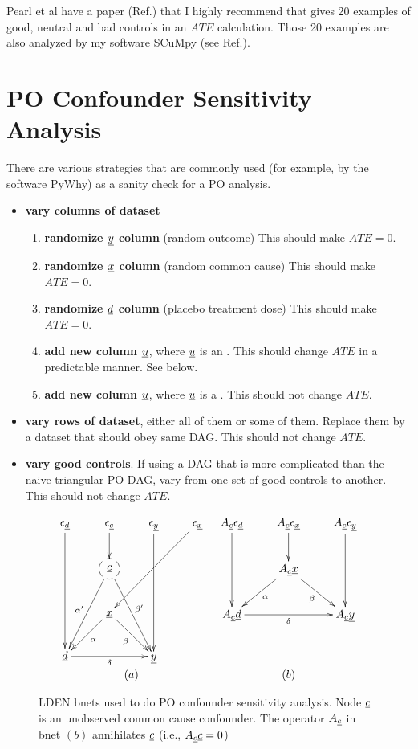 Pearl et al have a paper
(Ref.\cite{pearl-good-neutral-bad})
that I highly recommend
that gives 20 examples
of good, neutral and
bad controls
in an $ATE$ calculation.
Those 20 examples are also analyzed
by my software SCuMpy (see Ref.\cite{scumpy}).

\section{PO Confounder Sensitivity Analysis}
\label{intro-pot-out-sensitivity}

There are various  strategies that are commonly
used (for example, by
the software PyWhy)
as a sanity check for a
PO analysis.
\begin{itemize}
\item {\bf vary columns of dataset}
\begin{enumerate}
\item {\bf randomize $\rvy$ column} (random outcome) This should make $ATE=0$.
\item {\bf randomize $\rvx$ column}
(random common cause) This should make $ATE=0$.
\item {\bf randomize $\rvd$ column} (placebo treatment dose) This should make $ATE=0$.
\item {\bf add new column $\rvu$}, where $\rvu$ is an .
This should change $ATE$ 
in a predictable manner. See below.
\item {\bf add new column $\rvu$}, where $\rvu$ is a .
This should not change $ATE$.
\end{enumerate}
\item {\bf vary rows of dataset},
either all of them or some of them.
Replace them by a dataset that 
should obey same DAG.
This should not change $ATE$.
\item {\bf vary good controls}. If using
a DAG that is more complicated than the
naive triangular PO DAG,
vary from one set of good
controls to another.
This should not change $ATE$.

\end{itemize}


\begin{figure}[h!]
$$
\begin{array}{cc}
\xymatrix{
\eps_\rvd\ar[ddd]
&\eps_\rvc\ar[d]
&\eps_\rvy\ar[ddd]
&\eps_\rvx\ar[lldd]
\\
&*++[F-o]{\rvc}\ar[ldd]_{\alp'}
\ar[rdd]^{\beta'}
\\
&\rvx
\ar[ld]^\alp
\ar[rd]_\beta
\\
\rvd\ar[rr]_\delta
&&\rvy
}
&
\xymatrix{
A_\rvc\eps_\rvd\ar[dd]
&A_\rvc\eps_\rvx\ar[d]
&A_\rvc\eps_\rvy\ar[dd]
\\
&A_\rvc\rvx
\ar[ld]^\alp
\ar[rd]_\beta
\\
A_\rvc\rvd\ar[rr]_\delta
&&A_\rvc\rvy
}
\\
(a)&(b)
\end{array}
$$
\caption{LDEN bnets used to do PO confounder
sensitivity analysis.
Node $\rvc$
is an unobserved common cause confounder. 
The operator $A_\rvc$ in bnet $(b)$ annihilates $\rvc$ (i.e., $A_\rvc \rvc =0$)}
\label{eq-po-sen-ana}
\end{figure}

